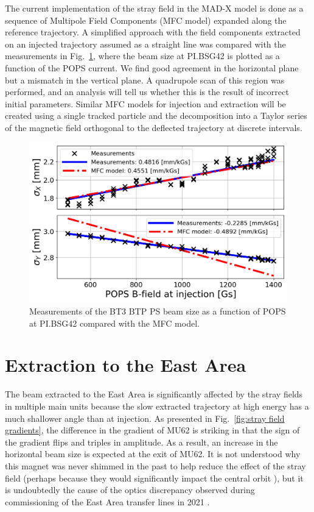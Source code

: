 \documentclass[a4paper,
               biblatex,     %
               keeplastbox,   %
               ]{jacow}
\begin{document}
The current implementation of the stray field in the \mbox{MAD-X} model is done as a sequence of Multipole Field Components (MFC model) expanded along the reference trajectory. A simplified approach with the field components extracted on an injected trajectory assumed as a straight line was compared with the measurements in Fig.~\ref{fig:injection_btp_beam_size}, where the beam size at PI.BSG42 is plotted as a function of the POPS current. We find good agreement in the horizontal plane but a mismatch in the vertical plane. A quadrupole scan of this region was performed, and an analysis will tell us whether this is the result of incorrect initial parameters. Similar MFC models for injection and extraction will be created using a single tracked particle and the decomposition into a Taylor series of the magnetic field orthogonal to the deflected trajectory at discrete intervals.

\begin{figure}[!htb]
   \centering
   \includegraphics*[width=1.0\columnwidth]{Beam_size_vs_POPS.png}
   \caption{Measurements of the BT3 BTP PS beam size as a function of POPS at PI.BSG42 compared with the MFC model.}
   \label{fig:injection_btp_beam_size}
\end{figure}

\section{Extraction to the East Area}
The beam extracted to the East Area is significantly affected by the stray fields in multiple main units because the slow extracted trajectory at high energy has a much shallower angle than at injection. As presented in Fig.~\ref{fig:stray field gradients}, the difference in the gradient of MU62 is striking in that the sign of the gradient flips and triples in amplitude. As a result, an increase in the horizontal beam size is expected at the exit of MU62. It is not understood why this magnet was never shimmed in the past to help reduce the effect of the stray field (perhaps because they would significantly impact the central orbit \cite{Zickler:private}), but it is undoubtedly the cause of the optics discrepancy observed during commissioning of the East Area transfer lines in 2021 \cite{huschauer:ipac22-mopost006}.
\end{document}
